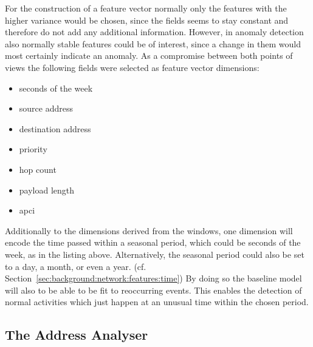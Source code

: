 For the construction of a feature vector normally only the features with the higher variance would be chosen, since the fields seems to stay constant and therefore do not add any additional information.
However, in anomaly detection also normally stable features could be of interest, since a change in them would most certainly indicate an anomaly.
As a compromise between both points of views the following fields were selected as feature vector dimensions:

\begin{itemize}
	\item seconds of the week
	\item source address
	\item destination address
	\item priority
	\item hop count
	\item payload length
	\item \gls{apci}
\end{itemize}

Additionally to the dimensions derived from the windows, one dimension will encode the time passed within a seasonal period, which could be seconds of the week, as in the listing above. Alternatively, the seasonal period could also be set to a day, a month, or even a year. (cf. Section~\ref{sec:background:network:features:time})
By doing so the baseline model will also to be able to be fit to reoccurring events. This enables the detection of normal activities which just happen at an unusual time within the chosen period.

\subsection{The Address Analyser}
\label{sec:concept:anal:addr}

